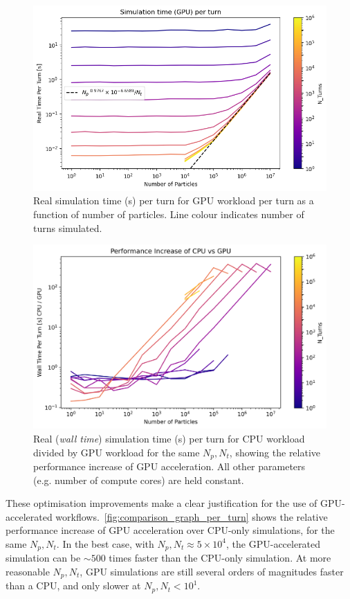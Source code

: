 \documentclass[a4paper,twoside,11pt]{report}
\begin{document}
\begin{figure}[h]
  \centering
  \includegraphics*[width=0.77\linewidth]{GPU_graph_per_turn.png}
  \caption[GPU-accelerated simulation time performance]{Real simulation time (s) per turn for GPU workload per turn as a function of number of particles. Line colour indicates number of turns simulated.}\label{fig:gpu_graph_per_turn}
\end{figure}

\begin{figure}
  \centering
  \includegraphics*[width=0.77\linewidth]{COMPARISON_graph_per_turn.png}
  \cprotect\caption[Comparison of simulation time performance between CPU and GPU workloads]{Real (\textit{wall time}) simulation time (s) per turn for CPU workload divided by GPU workload for the same $N_p, N_t$, showing the relative performance increase of GPU acceleration. All other parameters (e.g. number of compute cores) are held constant.}\label{fig:comparison_graph_per_turn}
\end{figure}

These optimisation improvements make a clear justification for the use of GPU-accelerated workflows.~\autoref{fig:comparison_graph_per_turn} shows the relative performance increase of GPU acceleration over CPU-only simulations, for the same $N_p, N_t$. In the best case, with $N_p, N_t \approx 5\times 10^4$, the GPU-accelerated simulation can be $\sim 500$ times faster than the CPU-only simulation. At more reasonable $N_p, N_t$, GPU simulations are still several orders of magnitudes faster than a CPU, and only slower at $N_p, N_t < 10^1$.
\end{document}
